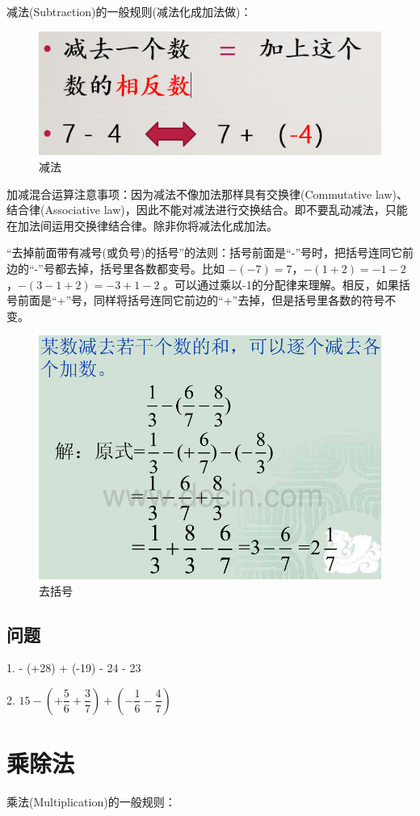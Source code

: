 \documentclass[UTF8,12pt]{ctexart}
\begin{document}
减法(Subtraction)的一般规则(减法化成加法做)：
\begin{figure}[htb]
\centering
\includegraphics[width = .55\textwidth]{subtraction.png}
\caption{减法}
\label{fig:subtraction}
\end{figure}

加减混合运算注意事项：因为减法不像加法那样具有交换律(Commutative law)、结合律(Associative law)，因此不能对减法进行交换结合。即不要乱动减法，只能在加法间运用交换律结合律。除非你将减法化成加法。

“去掉前面带有减号(或负号)的括号”的法则：括号前面是“-”号时，把括号连同它前边的“-”号都去掉，括号里各数都变号。比如 $ -(-7) = 7 $，$ -(1+2) = -1-2 $，$ -(3-1+2) = -3+1-2 $ 。可以通过乘以-1的分配律来理解。相反，如果括号前面是“+”号，同样将括号连同它前边的“+”去掉，但是括号里各数的符号不变。

\begin{figure}[htb]
\centering
\includegraphics[width = .55\textwidth]{quit-bracket.png}
\caption{去括号}
\label{fig:quit-bracket}
\end{figure}

\subsection{问题}
1.  - (+28) + (-19) - 24 - 23

2. \quad $ 15 - (+\dfrac{5}{6}+\dfrac{3}{7}) + (-\dfrac{1}{6}-\dfrac{4}{7}) $

\newpage
\section{乘除法}
乘法(Multiplication)的一般规则：
\end{document}
